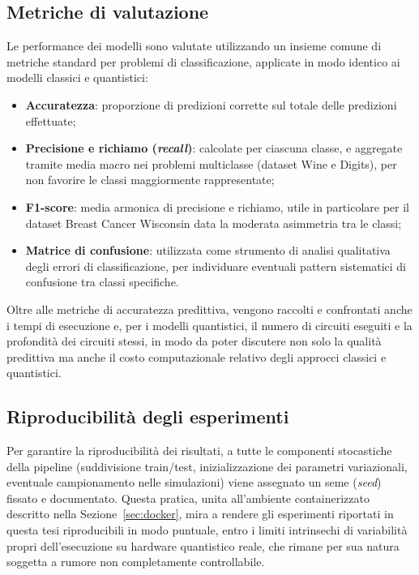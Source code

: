\subsection{Metriche di valutazione}
Le performance dei modelli sono valutate utilizzando un insieme comune di metriche standard per problemi di classificazione, applicate in modo identico ai modelli classici e quantistici:
\begin{itemize}
    \item \textbf{Accuratezza}: proporzione di predizioni corrette sul totale delle predizioni effettuate;
    \item \textbf{Precisione e richiamo (\textit{recall})}: calcolate per ciascuna classe, e aggregate tramite media macro nei problemi multiclasse (dataset Wine e Digits), per non favorire le classi maggiormente rappresentate;
    \item \textbf{F1-score}: media armonica di precisione e richiamo, utile in particolare per il dataset Breast Cancer Wisconsin data la moderata asimmetria tra le classi;
    \item \textbf{Matrice di confusione}: utilizzata come strumento di analisi qualitativa degli errori di classificazione, per individuare eventuali pattern sistematici di confusione tra classi specifiche.
\end{itemize}

Oltre alle metriche di accuratezza predittiva, vengono raccolti e confrontati anche i tempi di esecuzione e, per i modelli quantistici, il numero di circuiti eseguiti e la profondità dei circuiti stessi, in modo da poter discutere non solo la qualità predittiva ma anche il costo computazionale relativo degli approcci classici e quantistici.

\subsection{Riproducibilità degli esperimenti}
Per garantire la riproducibilità dei risultati, a tutte le componenti stocastiche della pipeline (suddivisione train/test, inizializzazione dei parametri variazionali, eventuale campionamento nelle simulazioni) viene assegnato un seme (\textit{seed}) fissato e documentato. Questa pratica, unita all'ambiente containerizzato descritto nella Sezione~\ref{sec:docker}, mira a rendere gli esperimenti riportati in questa tesi riproducibili in modo puntuale, entro i limiti intrinsechi di variabilità propri dell'esecuzione su hardware quantistico reale, che rimane per sua natura soggetta a rumore non completamente controllabile.

